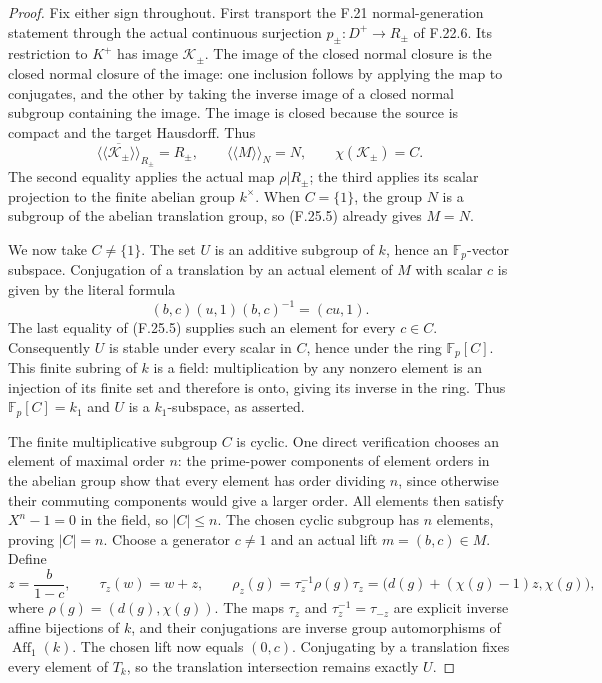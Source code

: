 \begin{proof}
Fix either sign throughout. First transport the F.21
normal-generation statement through the actual continuous
surjection $p_\pm:D^+\to R_\pm$ of F.22.6. Its restriction
to $K^+$ has image $\mathcal K_\pm$. The image of the
closed normal closure is the closed normal closure of
the image: one inclusion follows by applying the map
to conjugates, and the other by taking the inverse
image of a closed normal subgroup containing the image.
The image is closed because the source is compact and
the target Hausdorff. Thus
\[
 \overline{\langle\!\langle\mathcal K_\pm
                         \rangle\!\rangle}_{R_\pm}=R_\pm,
 \qquad
 \langle\!\langle M\rangle\!\rangle_N=N,
 \qquad \chi(\mathcal K_\pm)=C.                               \tag{F.25.5}
\]
The second equality applies the actual map
$\rho|R_\pm$; the third applies its scalar projection
to the finite abelian group $k^\times$. When $C=\{1\}$,
the group $N$ is a subgroup of the abelian translation
group, so (F.25.5) already gives $M=N$.

We now take $C\ne\{1\}$. The set $U$ is an additive
subgroup of $k$, hence an $\mathbb F_p$-vector subspace.
Conjugation of a translation by an actual element of
$M$ with scalar $c$ is given by the literal formula
\[
             (b,c)(u,1)(b,c)^{-1}=(cu,1).                    \tag{F.25.6}
\]
The last equality of (F.25.5) supplies such an element
for every $c\in C$. Consequently $U$ is stable under
every scalar in $C$, hence under the ring
$\mathbb F_p[C]$. This finite subring of $k$ is a field:
multiplication by any nonzero element is an injection
of its finite set and therefore is onto, giving its
inverse in the ring. Thus $\mathbb F_p[C]=k_1$ and
$U$ is a $k_1$-subspace, as asserted.

The finite multiplicative subgroup $C$ is cyclic.
One direct verification chooses an element of maximal
order $n$: the prime-power components of element
orders in the abelian group show that every element
has order dividing $n$, since otherwise their commuting
components would give a larger order. All elements
then satisfy $X^n-1=0$ in the field, so $|C|\leq n$.
The chosen cyclic subgroup has $n$ elements, proving
$|C|=n$. Choose a generator $c\ne1$ and an actual
lift $m=(b,c)\in M$. Define
\[
 z=\frac{b}{1-c},\qquad \tau_z(w)=w+z,
 \qquad
 \rho_z(g)=\tau_z^{-1}\rho(g)\tau_z
           =\bigl(d(g)+(\chi(g)-1)z,\chi(g)\bigr),             \tag{F.25.7}
\]
where $\rho(g)=(d(g),\chi(g))$. The maps $\tau_z$ and
$\tau_z^{-1}=\tau_{-z}$ are explicit inverse affine
bijections of $k$, and their conjugations are inverse
group automorphisms of $\operatorname{Aff}_1(k)$.
The chosen lift now equals $(0,c)$. Conjugating by a
translation fixes every element of $T_k$, so the
translation intersection remains exactly $U$.


\end{proof}
